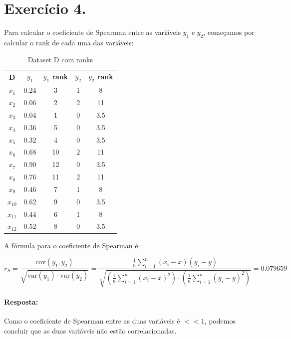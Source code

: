 \documentclass{article}
\begin{document}
\newpage

\section{Exercício 4.}

Para calcular o coeficiente de Spearman entre as variáveis $y_1$ e $y_2$, começamos por calcular o rank de cada uma das variáveis:

\begin{table}[h!]
  \centering
  \begin{tabular}{|c|c|c|c|c|}
    \hline
    D      & $y_1$ & $y_1$ rank & $y_2$ & $y_2$ rank \\ \hline
    $x_1$  & 0.24  & 3          & 1     & 8          \\ \hline
    $x_2$  & 0.06  & 2          & 2     & 11          \\ \hline
    $x_3$  & 0.04  & 1          & 0     & 3.5         \\ \hline
    $x_4$  & 0.36  & 5          & 0     & 3.5          \\ \hline
    $x_5$  & 0.32  & 4          & 0     & 3.5          \\ \hline
    $x_6$  & 0.68  & 10          & 2     & 11          \\ \hline
    $x_7$  & 0.90  & 12          & 0     & 3.5          \\ \hline
    $x_8$  & 0.76  & 11          & 2     & 11          \\ \hline
    $x_9$  & 0.46  & 7          & 1     & 8         \\ \hline
    $x_{10}$ & 0.62  & 9          & 0     & 3.5          \\ \hline
    $x_{11}$ & 0.44  & 6          & 1     & 8          \\ \hline
    $x_{12}$ & 0.52  & 8          & 0     & 3.5          \\ \hline
  \end{tabular}
  \caption{Dataset D com ranks}
  \label{tab:datasetD_ranks}
\end{table}

A fórmula para o coeficiente de Spearman é:

\[ r_S = \frac{\text{cov}(y_1, y_2)}{\sqrt{\text{var}(y_1)\cdot \text{var}(y_2)}} = \frac{\frac{1}{n} \sum_{i=1}^{n} (x_i - \bar{x})(y_i - \bar{y})}{ \sqrt{\left(\frac{1}{n} \sum_{i=1}^{n} (x_i - \bar{x})^2 \right) \cdot \left(\frac{1}{n} \sum_{i=1}^{n} (y_i - \bar{y})^2 \right)}} = 0.079659 \]

\paragraph{Resposta: }Como o coeficiente de Spearman entre as duas variáveis é $<< 1$, podemos concluir que as duas variáveis não estão correlacionadas.
\end{document}

